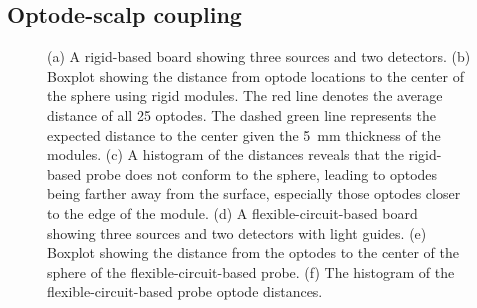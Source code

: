 \subsection{Optode-scalp coupling}
\begin{figure}
	\begin{center}
	\end{center}
	\caption{(a) A rigid-based board showing three sources and two detectors. (b) Boxplot showing the distance from optode locations to the center of the sphere using rigid modules. The red line denotes the average distance of all 25 optodes. The dashed green line represents the expected distance to the center given the 5~mm thickness of the modules. (c) A histogram of the distances reveals that the rigid-based probe does not conform to the sphere, leading to optodes being farther away from the surface, especially those optodes closer to the edge of the module. (d) A flexible-circuit-based board showing three sources and two detectors with light guides. (e) Boxplot showing the distance from the optodes to the center of the sphere of the flexible-circuit-based probe. (f) The histogram of the flexible-circuit-based probe optode distances.} 
	\label{fig:coupling}
\end{figure} 
